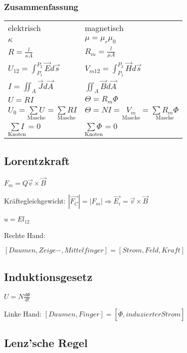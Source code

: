 \documentclass[10pt,a4paper]{scrartcl}
\begin{document}
\begin{multicols*}{3}
	\subsubsection{Zusammenfassung}
	
	\begin{tabular*}{\linewidth}{ll}
	elektrisch & magnetisch\\
	$\kappa$&$\mu = \mu_r\mu_0$\\
	$R=\frac{l}{\kappa A}$&$R_m=\frac{l}{\mu A}$\\
	$U_{12}=\int_{P_1}^{P_2}{\vec{E}d\vec{s}}$ & $V_{m12}=\int_{P_1}^{P_2}{\vec{H}d\vec{s}}$\\
	$I=\iint_A{\vec{J}d\vec{A}}$&$\iint_A{\vec{B}d\vec{A}}$\\
	$U=RI$&$\Theta=R_m\Phi$\\
	$U_0 = \underset{\text{Masche}}{\sum{U}}=\underset{\text{Masche}}{\sum{RI}}$&$\Theta = NI = \underset{\text{Masche}}{V_m}=\underset{\text{Masche}}{\sum{R_m\Phi}}$\\
	$\underset{\text{Knoten}}{\sum{I}}=0$&$\underset{\text{Knoten}}{\sum{\Phi}}=0$
	\end{tabular*}
	
	\finn
	
	\subsection{Lorentzkraft}
	
	$F_m=Q\vec{v}\times\vec{B}$
	
	Kräftegleichgewicht: $|\vec{F_C}|=|F_m|\Rightarrow\vec{E_i}=\vec{v}\times\vec{B}$
	
	$u=El_{12}$
	
	
	Rechte Hand: 
	
	\small$[Daumen,Zeige-,Mittelfinger]=[Strom,Feld,Kraft]$\normalsize
	
	\subsection{Induktionsgesetz}
	
	$U=N\frac{d\Phi}{dt}$
	
	Linke Hand: \small$[Daumen, Finger]=[\dot{\Phi},induzierter Strom]$\normalsize
	
	\columnbreak
		
	\subsection{Lenz'sche Regel}
	

\end{multicols*}
\end{document}
